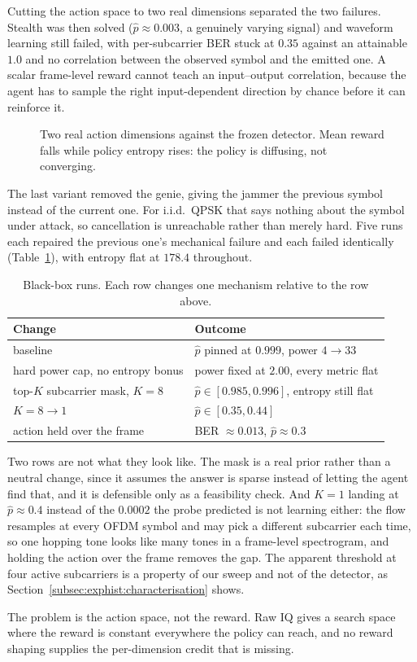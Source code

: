 Cutting the action space to two real dimensions separated the two failures.
Stealth was then solved ($\hat{p} \approx 0.003$, a genuinely varying signal) and waveform learning
still failed, with per-subcarrier BER stuck at $0.35$ against an attainable $1.0$ and no correlation
between the observed symbol and the emitted one.
A scalar frame-level reward cannot teach an input--output correlation, because the agent has to sample
the right input-dependent direction by chance before it can reinforce it.

\begin{figure}[!t]
\centering
\caption{Two real action dimensions against the frozen detector. Mean reward falls while policy entropy
rises: the policy is diffusing, not converging.}
\label{fig:diffusion}
\end{figure}

The last variant removed the genie, giving the jammer the previous symbol instead of the current one.
For i.i.d.\ QPSK that says nothing about the symbol under attack, so cancellation is unreachable rather
than merely hard.
Five runs each repaired the previous one's mechanical failure and each failed identically
(Table~\ref{tab:blackbox}), with entropy flat at $178.4$ throughout.

\begin{table}[!t]
\renewcommand{\arraystretch}{1.3}
\caption{Black-box runs. Each row changes one mechanism relative to the row above.}
\label{tab:blackbox}
\centering
\begin{tabular}{l l}
\hline\hline
\textbf{Change} & \textbf{Outcome} \\
\hline
baseline                         & $\hat{p}$ pinned at $0.999$, power $4 \to 33$ \\
hard power cap, no entropy bonus & power fixed at $2.00$, every metric flat \\
top-$K$ subcarrier mask, $K=8$   & $\hat{p} \in [0.985, 0.996]$, entropy still flat \\
$K = 8 \to 1$                    & $\hat{p} \in [0.35, 0.44]$ \\
action held over the frame       & BER $\approx 0.013$, $\hat{p} \approx 0.3$ \\
\hline\hline
\end{tabular}
\end{table}

Two rows are not what they look like.
The mask is a real prior rather than a neutral change, since it assumes the answer is sparse instead of
letting the agent find that, and it is defensible only as a feasibility check.
And $K=1$ landing at $\hat{p} \approx 0.4$ instead of the $0.0002$ the probe predicted is not learning
either: the flow resamples at every OFDM symbol and may pick a different subcarrier each time, so one
hopping tone looks like many tones in a frame-level spectrogram, and holding the action over the frame
removes the gap.
The apparent threshold at four active subcarriers is a property of our sweep and not of the detector,
as Section~\ref{subsec:exphist:characterisation} shows.

The problem is the action space, not the reward.
Raw IQ gives a search space where the reward is constant everywhere the policy can reach, and no
reward shaping supplies the per-dimension credit that is missing.
